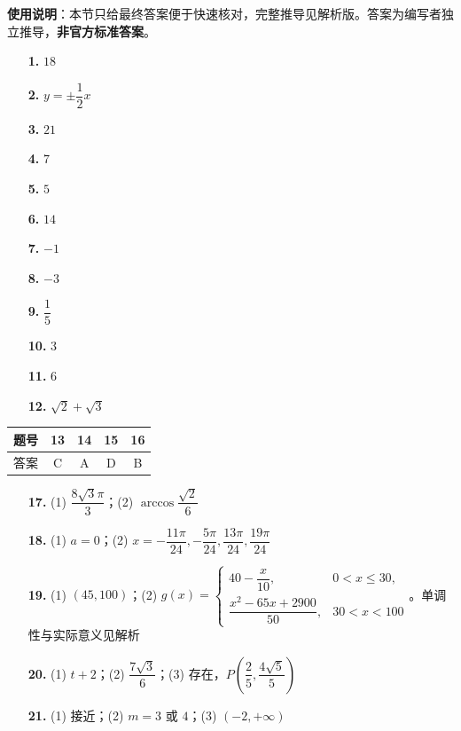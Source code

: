 
\begin{gknotice}
\textbf{使用说明}：本节只给最终答案便于快速核对，完整推导见解析版。答案为编写者独立推导，\textbf{非官方标准答案}。
\end{gknotice}

\begin{itemize}[leftmargin=2.6em]
  \item[\textbf{1.}] $18$
  \item[\textbf{2.}] $y = \pm \dfrac{1}{2}x$
  \item[\textbf{3.}] $21$
  \item[\textbf{4.}] $7$
  \item[\textbf{5.}] $5$
  \item[\textbf{6.}] $14$
  \item[\textbf{7.}] $-1$
  \item[\textbf{8.}] $-3$
  \item[\textbf{9.}] $\dfrac{1}{5}$
  \item[\textbf{10.}] $3$
  \item[\textbf{11.}] $6$
  \item[\textbf{12.}] $\sqrt{2} + \sqrt{3}$
\end{itemize}

\begin{center}\begin{tabular}{ccccc}
\toprule
题号 & 13 & 14 & 15 & 16 \\
\midrule
答案 & C & A & D & B \\
\bottomrule
\end{tabular}\end{center}

\begin{itemize}[leftmargin=2.6em]
  \item[\textbf{17.}] (1) $\dfrac{8\sqrt{3}\pi}{3}$；(2) $\arccos\dfrac{\sqrt{2}}{6}$
  \item[\textbf{18.}] (1) $a = 0$；(2) $x = -\dfrac{11\pi}{24}, -\dfrac{5\pi}{24}, \dfrac{13\pi}{24}, \dfrac{19\pi}{24}$
  \item[\textbf{19.}] (1) $(45, 100)$；(2) $g(x) = \begin{cases} 40 - \dfrac{x}{10}, & 0 < x \le 30, \\ \dfrac{x^2 - 65x + 2900}{50}, & 30 < x < 100 \end{cases}$。单调性与实际意义见解析
  \item[\textbf{20.}] (1) $t + 2$；(2) $\dfrac{7\sqrt{3}}{6}$；(3) 存在，$P\left(\dfrac{2}{5}, \dfrac{4\sqrt{5}}{5}\right)$
  \item[\textbf{21.}] (1) 接近；(2) $m = 3$ 或 $4$；(3) $(-2, +\infty)$
\end{itemize}
